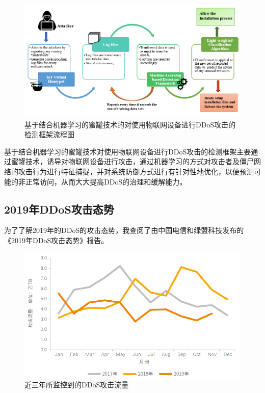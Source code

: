 \documentclass{article}
\begin{document}
\begin{figure}[h!]
    \centering
    \includegraphics[scale=0.6]{2}
    \caption{基于结合机器学习的蜜罐技术的对使用物联网设备进行DDoS攻击的检测框架流程图}
    \label{fig:2}
\end{figure}

基于结合机器学习的蜜罐技术对使用物联网设备进行DDoS攻击的检测框架主要通过蜜罐技术，诱导对物联网设备进行攻击，通过机器学习的方式对攻击者及僵尸网络的攻击行为进行特征捕捉，并对系统防御方式进行有针对性地优化，以便预测可能的非正常访问，从而大大提高DDoS的治理和缓解能力。

\subsection{2019年DDoS攻击态势}

为了了解2019年的DDoS的攻击态势，我查阅了由中国电信和绿盟科技发布的《2019年DDoS攻击态势》报告\cite{ref9}。

\begin{figure}[h!]
    \centering
    \includegraphics[scale=0.6]{3}
    \caption{近三年所监控到的DDoS攻击流量}
    \label{fig:3}
\end{figure}
\end{document}
